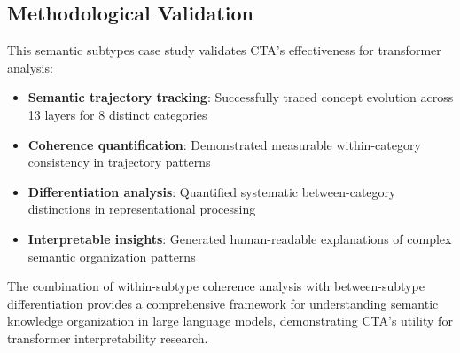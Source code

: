 \subsection{Methodological Validation}

This semantic subtypes case study validates CTA's effectiveness for transformer analysis:

\begin{itemize}
    \item \textbf{Semantic trajectory tracking}: Successfully traced concept evolution across 13 layers for 8 distinct categories
    \item \textbf{Coherence quantification}: Demonstrated measurable within-category consistency in trajectory patterns
    \item \textbf{Differentiation analysis}: Quantified systematic between-category distinctions in representational processing
    \item \textbf{Interpretable insights}: Generated human-readable explanations of complex semantic organization patterns
\end{itemize}

The combination of within-subtype coherence analysis with between-subtype differentiation provides a comprehensive framework for understanding semantic knowledge organization in large language models, demonstrating CTA's utility for transformer interpretability research.